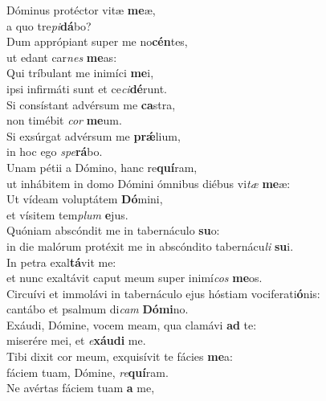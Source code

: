 \evenverse Dóminus protéctor vitæ \textbf{me}æ,~\*\\
\evenverse a quo tre\textit{pi}\textbf{dá}bo?\\
\oddverse Dum apprópiant super me no\textbf{cén}tes,~\*\\
\oddverse ut edant car\textit{nes} \textbf{me}as:\\
\evenverse Qui tríbulant me inimíci \textbf{me}i,~\*\\
\evenverse ipsi infirmáti sunt et ce\textit{ci}\textbf{dé}runt.\\
\oddverse Si consístant advérsum me \textbf{ca}stra,~\*\\
\oddverse non timébit \textit{cor} \textbf{me}um.\\
\evenverse Si exsúrgat advérsum me \textbf{prǽ}lium,~\*\\
\evenverse in hoc ego \textit{spe}\textbf{rá}bo.\\
\oddverse Unam pétii a Dómino, hanc re\textbf{quí}ram,~\*\\
\oddverse ut inhábitem in domo Dómini ómnibus diébus vi\textit{tæ} \textbf{me}æ:\\
\evenverse Ut vídeam voluptátem \textbf{Dó}mini,~\*\\
\evenverse et vísitem tem\textit{plum} \textbf{e}jus.\\
\oddverse Quóniam abscóndit me in tabernáculo \textbf{su}o:~\*\\
\oddverse in die malórum protéxit me in abscóndito tabernácu\textit{li} \textbf{su}i.\\
\evenverse In petra exal\textbf{tá}vit me:~\*\\
\evenverse et nunc exaltávit caput meum super inimí\textit{cos} \textbf{me}os.\\
\oddverse Circuívi et immolávi in tabernáculo ejus hóstiam vociferati\textbf{ó}nis:~\*\\
\oddverse cantábo et psalmum di\textit{cam} \textbf{Dó}\textbf{mi}no.\\
\evenverse Exáudi, Dómine, vocem meam, qua clamávi \textbf{ad} te:~\*\\
\evenverse miserére mei, et \textit{e}\textbf{xáu}\textbf{di} me.\\
\oddverse Tibi dixit cor meum, exquisívit te fácies \textbf{me}a:~\*\\
\oddverse fáciem tuam, Dómine, \textit{re}\textbf{quí}ram.\\
\evenverse Ne avértas fáciem tuam \textbf{a} me,~\*\\
